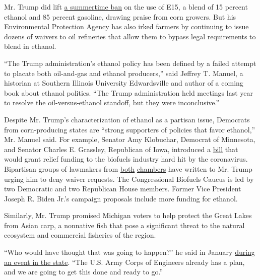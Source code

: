 Mr. Trump did lift
\href{https://www.nytimes3xbfgragh.onion/2019/05/31/climate/trump-ethanol-fuel-ban.html}{a
summertime ban} on the use of E15, a blend of 15 percent ethanol and 85
percent gasoline, drawing praise from corn growers. But his
Environmental Protection Agency has also irked farmers by continuing to
issue dozens of waivers to oil refineries that allow them to bypass
legal requirements to blend in ethanol.

``The Trump administration's ethanol policy has been defined by a failed
attempt to placate both oil-and-gas and ethanol producers,'' said
Jeffrey T. Manuel, a historian at Southern Illinois University
Edwardsville and author of a coming book about ethanol politics. ``The
Trump administration held meetings last year to resolve the
oil-versus-ethanol standoff, but they were inconclusive.''

Despite Mr. Trump's characterization of ethanol as a partisan issue,
Democrats from corn-producing states are ``strong supporters of policies
that favor ethanol,'' Mr. Manuel said. For example, Senator Amy
Klobuchar, Democrat of Minnesota, and Senator Charles E. Grassley,
Republican of Iowa, introduced a
\href{https://www.klobuchar.senate.gov/public/index.cfm/2020/5/klobuchar-grassley-introduce-bill-to-support-biofuel-producers}{bill}
that would grant relief funding to the biofuels industry hard hit by the
coronavirus. Bipartisan groups of lawmakers from
\href{https://finkenauer.house.gov/sites/finkenauer.house.gov/files/RFS\%20Waiver\%20letter\%20-\%20Final\%5B1\%5D.pdf}{both}
\href{https://www.ernst.senate.gov/public/_cache/files/2491e051-f2e5-4701-8727-9958d46cc9ff/08FD201527A837DBF9839F7E76AF4F50.rfs-waiver-letter-to-potus-final.pdf}{chambers}
have written to Mr. Trump urging him to deny waiver requests. The
Congressional Biofuels Caucus is led by two Democratic and two
Republican House members. Former Vice President Joseph R. Biden Jr.'s
campaign proposals include more funding for ethanol.

Similarly, Mr. Trump promised Michigan voters to help protect the Great
Lakes from Asian carp, a nonnative fish that pose a significant threat
to the natural ecosystem and commercial fisheries of the region.

``Who would have thought that was going to happen?'' he said in January
\href{https://www.whitehouse.gov/briefings-statements/remarks-president-trump-usmca-celebration-american-workers-warren-mi/}{during
an event in the state}. ``The U.S. Army Corps of Engineers already has a
plan, and we are going to get this done and ready to go.''

